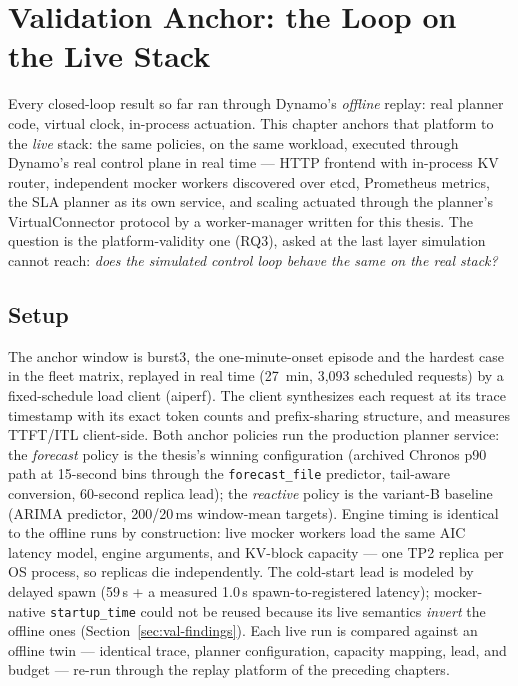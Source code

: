 \chapter{Validation Anchor: the Loop on the Live Stack}
\label{cap:validation}

Every closed-loop result so far ran through Dynamo's \emph{offline}
replay: real planner code, virtual clock, in-process actuation. This
chapter anchors that platform to the \emph{live} stack: the same
policies, on the same workload, executed through Dynamo's real control
plane in real time --- HTTP frontend with in-process KV router,
independent mocker workers discovered over etcd, Prometheus metrics,
the SLA planner as its own service, and scaling actuated through the
planner's VirtualConnector protocol by a worker-manager written for
this thesis. The
question is the platform-validity one (RQ3), asked at the last layer
simulation cannot reach: \emph{does the simulated control loop behave
the same on the real stack?}

\section{Setup}
\label{sec:val-setup}

The anchor window is burst3, the one-minute-onset episode and the
hardest case in the fleet matrix, replayed in real time
(\SI{27}{\minute}, 3{,}093 scheduled requests) by a fixed-schedule load
client (aiperf). The client synthesizes each request at its trace timestamp with its
exact token counts and prefix-sharing structure, and measures TTFT/ITL
client-side. Both anchor policies run the production planner service:
the \emph{forecast} policy is the thesis's winning configuration
(archived Chronos p90 path at 15-second bins through the
\texttt{forecast\_file} predictor, tail-aware conversion, 60-second
replica lead); the \emph{reactive} policy is the variant-B baseline
(ARIMA predictor, 200/20\,ms window-mean targets). Engine timing is
identical to the offline runs by construction: live mocker workers load
the same AIC latency model, engine arguments, and KV-block capacity ---
one TP2 replica per OS process, so replicas die independently. The
cold-start lead is modeled by delayed spawn (59\,s + a measured
1.0\,s spawn-to-registered latency); mocker-native
\texttt{startup\_time} could not be reused because its live semantics
\emph{invert} the offline ones (Section~\ref{sec:val-findings}). Each
live run is compared against an offline twin --- identical trace,
planner configuration, capacity mapping, lead, and budget ---
re-run through the replay platform of the preceding chapters.

